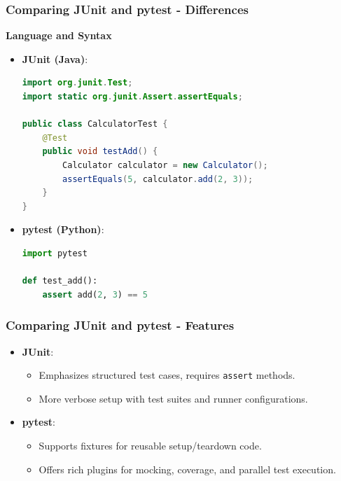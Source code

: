 \documentclass{beamer}
\begin{document}
\begin{frame}[fragile]
    \frametitle{Comparing JUnit and pytest - Differences}
    \textbf{Language and Syntax}
    \begin{itemize}
        \item \textbf{JUnit (Java)}:
        \begin{lstlisting}[language=java]
import org.junit.Test;
import static org.junit.Assert.assertEquals;

public class CalculatorTest {
    @Test
    public void testAdd() {
        Calculator calculator = new Calculator();
        assertEquals(5, calculator.add(2, 3));
    }
}
\end{lstlisting}
        \item \textbf{pytest (Python)}:
        \begin{lstlisting}[language=python]
import pytest

def test_add():
    assert add(2, 3) == 5
\end{lstlisting}
    \end{itemize}
\end{frame}

\begin{frame}[fragile]
    \frametitle{Comparing JUnit and pytest - Features}
    \begin{itemize}
        \item \textbf{JUnit}:
        \begin{itemize}
            \item Emphasizes structured test cases, requires \texttt{assert} methods.
            \item More verbose setup with test suites and runner configurations.
        \end{itemize}
        \item \textbf{pytest}:
        \begin{itemize}
            \item Supports fixtures for reusable setup/teardown code.
            \item Offers rich plugins for mocking, coverage, and parallel test execution.
        \end{itemize}
    \end{itemize}
\end{frame}
\end{document}
